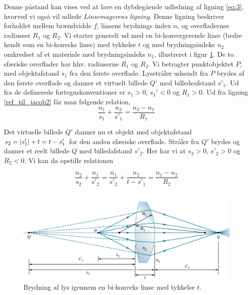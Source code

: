 \noindent Denne påstand kan vises ved at lave en dybdegående udledning af ligning \eqref{eq:3}, hvorved vi også vil udlede \textsl{Linsemagerens ligning}. Denne ligning beskriver forholdet mellem brændvidde $f$, linsens brydnings index $n$, og overfladernes radiusser $R_1$ og $R_2$. Vi starter generelt ud med en bi-konvergerende linse (bedre kendt som en bi-konveks linse) med tykkelse $t$ og med brydningsindeks $n_2$ omkredset af et materiale med brydningsindeks $n_1$, illustreret i figur \ref{bikonv}. De to sfæriske overflader har hhv. radiuserne $R_1$ og $R_2$. Vi betragter punktobjektet $P$, med objektafstand $s_1$ fra den første overflade. Lysstråler udsendt fra $P$ brydes af den første overflade og danner et virtuelt billede $Q'$ med billedeafstand $s'_1$. Ud fra de definerede fortegnskonventioner er $s_1>0$, $s_1'<0$ og $R_1>0$. Ud fra ligning \eqref{ref_til_jacob2} får man følgende relation,
\begin{equation}
\frac{n_1}{s_1}+\frac{n_2}{s'_1} = \frac{n_2-n_1}{R_1}
\label{eq:5}
\end{equation}

\noindent Det virtuelle billede $Q'$ danner nu et objekt med objektafstand $s_2 = \left| s'_1 \right|+t = t-s'_1$ for den anden sfæriske overflade. Stråler fra $Q'$ brydes og danner et reelt billede $Q$ med billedafstand $s'_2$. Her har vi at $s_2>0$, $s'_2>0$ og $R_2 < 0$. Vi kan da opstille relationen

\begin{equation}
\frac{n_2}{s_2}+\frac{n_1}{s'_2} = \frac{n_1}{s'_2} + \frac{n_2}{t-s'_1} = \frac{n_1-n_2}{R_2}
\label{eq:6}
\end{equation}

\begin{figure}[h!]
	\centering
	\includegraphics[scale=0.3]{Geometrisk-Optik/lensmaker.PNG}
	\caption{Brydning af lys igennem en bi-konveks linse med tykkelse $t$.}
	\label{bikonv}
\end{figure}


